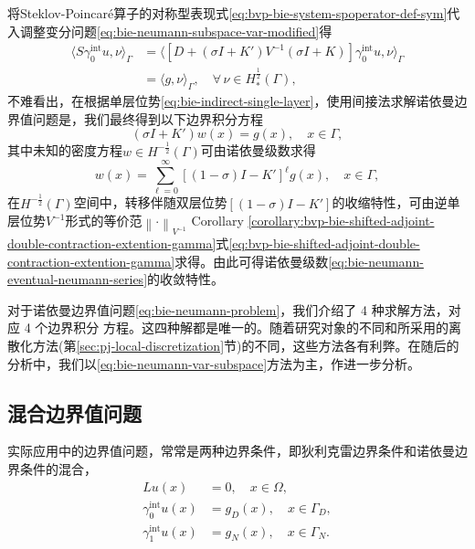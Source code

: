 将Steklov-Poincaré算子的对称型表现式\eqref{eq:bvp-bie-system-spoperator-def-sym}代入调整变分问题\eqref{eq:bie-neumann-subspace-var-modified}得
\begin{equation}
  \label{eq:bie-neumann-subspace-var-modified-sp}
\begin{split}
  \langle
  S \gamma_{0}^{\text{int}} u, \nu
  \rangle_{\Gamma}
  & = \langle
  \left[
  D + \left( \sigma I + K' \right) V^{-1} \left(\sigma I + K \right)
  \right]
  \gamma_{0}^{\text{int}} u, \nu
  \rangle_{\Gamma} \\
  & = \langle g, \nu \rangle_{\Gamma}, \quad \forall \, \nu \in H_{*}^{\frac{1}{2}}(\Gamma),
\end{split}
\end{equation}
不难看出，在根据单层位势\eqref{eq:bie-indirect-single-layer}，使用间接法求解诺依曼边界值问题是，我们最终得到以下边界积分方程
\begin{equation}
  \label{eq:bie-neumann-eventual}
  \left( \sigma I + K' \right) w(x) = g(x), \quad x \in \Gamma,
\end{equation}
其中未知的密度方程$w \in H^{-\frac{1}{2}}(\Gamma)$可由诺依曼级数求得
\begin{equation}
  \label{eq:bie-neumann-eventual-neumann-series}
  w(x) = \sum_{\ell = 0}^{\infty}
  \left[
  \left( 1 - \sigma \right) I - K'
  \right]^{\ell}
  g(x), \quad x \in \Gamma,
\end{equation}
在$H^{-\frac{1}{2}}(\Gamma)$空间中，转移伴随双层位势$\left[ \left( 1 - \sigma \right) I - K' \right]$的收缩特性，可由逆单层位势$V^{-1}$形式的等价范$\left\| \cdot \right\|_{V^{-1}}$
 Corollary \eqref{corollary:bvp-bie-shifted-adjoint-double-contraction-extention-gamma}式\eqref{eq:bvp-bie-shifted-adjoint-double-contraction-extention-gamma}求得。由此可得诺依曼级数\eqref{eq:bie-neumann-eventual-neumann-series}的收敛特性。

 \begin{remark}
   对于诺依曼边界值问题\eqref{eq:bie-neumann-problem}，我们介绍了 4 种求解方法，对应 4 个边界积分 方程。这四种解都是唯一的。随着研究对象的不同和所采用的离散化方法(第\ref{sec:pj-local-discretization}节)的不同，这些方法各有利弊。在随后的分析中，我们以\eqref{eq:bie-neumann-var-subspace}方法为主，作进一步分析。
 \end{remark}

 \subsection{混合边界值问题}
 \label{sec:bie-mixed}
 实际应用中的边界值问题，常常是两种边界条件，即狄利克雷边界条件和诺依曼边界条件的混合，
 \begin{equation}
   \label{eq:bie-mixed-problem}
   \begin{split}
     L u (x) &= 0, \quad x \in \Omega, \\
     \gamma_{0}^{\text{int}} u(x) &= g_{D}(x), \quad x \in \Gamma_{D}, \\
     \gamma_{1}^{\text{int}} u(x) &= g_{N}(x), \quad x \in \Gamma_{N}.
   \end{split}
 \end{equation}

